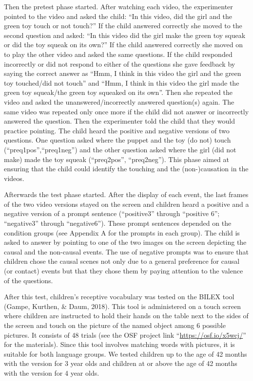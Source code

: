 \documentclass[man]{apa6}
\begin{document}
Then the pretest phase started. After watching each video, the
experimenter pointed to the video and asked the child: \enquote{In this
video, did the girl and the green toy touch or not touch?} If the child
answered correctly she moved to the second question and asked:
\enquote{In this video did the girl make the green toy squeak or did the
toy squeak on its own?} If the child answered correctly she moved on to
play the other video and asked the same questions. If the child
responded incorrectly or did not respond to either of the questions she
gave feedback by saying the correct answer as \enquote{Hmm, I think in
this video the girl and the green toy touched/did not touch} and
\enquote{Hmm, I think in this video the girl made the green toy
squeak/the green toy squeaked on its own}. Then she repeated the video
and asked the unanswered/incorrectly answered question(s) again. The
same video was repeated only once more if the child did not answer or
incorrectly answered the question. Then the experimenter told the child
that they would practice pointing. The child heard the positive and
negative versions of two questions. One question asked where the puppet
and the toy (do not) touch (\enquote{preq1pos},\enquote{preq1neg}) and the other question asked where the girl (did not make) made the toy squeak (\enquote{preq2pos}, \enquote{preq2neg}). This phase aimed at ensuring that the child could identify the touching and the (non-)causation in the videos.

Afterwards the test phase started. After the display of each event, the
last frames of the two video versions stayed on the screen and children
heard a positive and a negative version of a prompt sentence
(\enquote{positive3} through \enquote{positive 6}; \enquote{negative3}
through \enquote{negative6}). These prompt sentences depended on the
condition groups (see Appendix A for the prompts in each group). The
child is asked to answer by pointing to one of the two images on the
screen depicting the causal and the non-causal events. The use of
negative prompts was to ensure that children chose the causal scenes not
only due to a general preference for causal (or contact) events but that
they chose them by paying attention to the valence of the questions.

After this test, children's receptive vocabulary was tested on the BILEX
tool (Gampe, Kurthen, \& Daum, 2018). This tool is administered on a
touch screen where children are instructed to hold their hands on the
table next to the sides of the screen and touch on the picture of the
named object among 6 possible pictures. It consists of 48 trials (see
the OSF project link \enquote{\url{https://osf.io/x5wcj/}} for the
materials). Since this tool involves matching words with pictures, it is
suitable for both language groups. We tested children up to the age of
42 months with the version for 3 year olds and children at or above the
age of 42 months with the version for 4 year olds.
\end{document}
